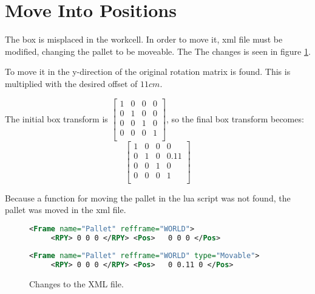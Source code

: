 \section{Move Into Positions}

The box is misplaced in the workcell.
In order to move it, xml file must be modified, changing the pallet to be moveable.
The 
The changes is seen in figure \ref{fig:commit_xml}.

To move it in the y-direction of the original rotation matrix is found.
This is multiplied with the desired offset of $11 cm$.

The initial box transform is 
\( 
\left[
 \begin{array}{ccc|c}
  1 & 0 & 0 & 0\\
  0 & 1 & 0 & 0\\
  0 & 0 & 1 & 0\\ \hline
  0 & 0 & 0 & 1\\
 \end{array}
\right]
\), so the final box transform becomes: 
\begin{equation}
\left[
 \begin{array}{ccc|c}
  1 & 0 & 0 & 0\\
  0 & 1 & 0 & 0.11\\
  0 & 0 & 1 & 0\\ \hline
  0 & 0 & 0 & 1\\
 \end{array}
\right]
\end{equation}

Because a function for moving the pallet in the lua script was not found, the pallet was moved in the xml file.

\begin{figure}[h]
 \centering
\begin{lstlisting}[backgroundcolor=\color{commit_remove},language=xml]
<Frame name="Pallet" refframe="WORLD">
     <RPY> 0 0 0 </RPY> <Pos>   0 0 0 </Pos>
\end{lstlisting}
\begin{lstlisting}[backgroundcolor=\color{commit_add},language=xml]
<Frame name="Pallet" refframe="WORLD" type="Movable"> 
     <RPY> 0 0 0 </RPY> <Pos>   0 0.11 0 </Pos>
\end{lstlisting}
\caption{Changes to the XML file. }
\label{fig:commit_xml}
\end{figure}

